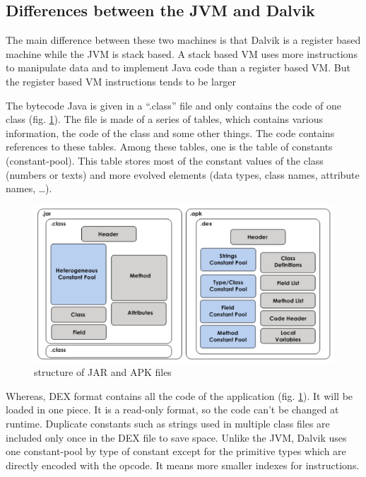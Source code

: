 \documentclass{sig-alternate}
\def \DALVIK{Dalvik\xspace}
\def \JVM{JVM\xspace}
\def \DEX{DEX\xspace}
\begin{document}
    \subsection{Differences between the JVM and Dalvik}

      The main difference between these two machines is that \DALVIK is a register based machine while the \JVM is stack based.
      A stack based VM uses more instructions to manipulate data and to implement Java code than a register based VM.
      But the register based VM instructions tends to be larger \cite{ieee-paul-kundu-energy-perspective}

      The bytecode Java is given in a ``.class'' file and only contains the code of one class (fig. \ref{SJA}).
      The file is made of a series of tables, which contains various information, the code of the class and some other things.
      The code contains references to these tables.
      Among these tables, one is the table of constants (constant-pool).
      This table stores most of the constant values of the class (numbers or texts)
      and more evolved elements (data types, class names, attribute names, \dots).

      \begin{figure}[h]
        \centering \includegraphics[width=\columnwidth]{structure-jar-apk.png}
        \caption{structure of JAR and APK files}
        \label{SJA}
      \end{figure}

      Whereas, \DEX format contains all the code of the application (fig. \ref{SJA}).
      It will be loaded in one piece.
      It is a read-only format, so the code can't be changed at runtime.
      Duplicate constants such as strings used in multiple class files
      are included only once in the \DEX file to save space.
      Unlike the \JVM, \DALVIK uses one constant-pool by type of constant
      except for the primitive types which are directly encoded with the opcode.
      It means more smaller indexes for instructions.\\
\end{document}
